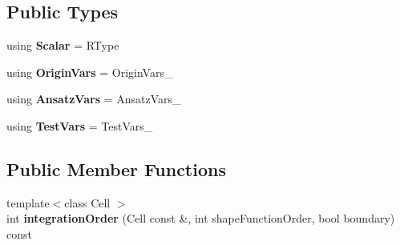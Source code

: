 \subsection*{Public Types}
\begin{DoxyCompactItemize}
\item 
\hypertarget{classSpacy_1_1KaskadeParabolic_1_1PDE_1_1ScalarProdFunctional_a0401febcf68c7c3039c04c3f81446681}{using {\bfseries Scalar} = R\-Type}\label{classSpacy_1_1KaskadeParabolic_1_1PDE_1_1ScalarProdFunctional_a0401febcf68c7c3039c04c3f81446681}

\item 
\hypertarget{classSpacy_1_1KaskadeParabolic_1_1PDE_1_1ScalarProdFunctional_a935bf4d6ee836a8bc6f942118f45908e}{using {\bfseries Origin\-Vars} = Origin\-Vars\-\_\-}\label{classSpacy_1_1KaskadeParabolic_1_1PDE_1_1ScalarProdFunctional_a935bf4d6ee836a8bc6f942118f45908e}

\item 
\hypertarget{classSpacy_1_1KaskadeParabolic_1_1PDE_1_1ScalarProdFunctional_aa3bbc2cc80221b33023c32572f2a8ebd}{using {\bfseries Ansatz\-Vars} = Ansatz\-Vars\-\_\-}\label{classSpacy_1_1KaskadeParabolic_1_1PDE_1_1ScalarProdFunctional_aa3bbc2cc80221b33023c32572f2a8ebd}

\item 
\hypertarget{classSpacy_1_1KaskadeParabolic_1_1PDE_1_1ScalarProdFunctional_a344ca91a5b5d2d13d48ce1dced9f01e6}{using {\bfseries Test\-Vars} = Test\-Vars\-\_\-}\label{classSpacy_1_1KaskadeParabolic_1_1PDE_1_1ScalarProdFunctional_a344ca91a5b5d2d13d48ce1dced9f01e6}

\end{DoxyCompactItemize}
\subsection*{Public Member Functions}
\begin{DoxyCompactItemize}
\item 
\hypertarget{classSpacy_1_1KaskadeParabolic_1_1PDE_1_1ScalarProdFunctional_a6757d413b953ed3c71d0ca1522604d79}{{\footnotesize template$<$class Cell $>$ }\\int {\bfseries integration\-Order} (Cell const \&, int shape\-Function\-Order, bool boundary) const }\label{classSpacy_1_1KaskadeParabolic_1_1PDE_1_1ScalarProdFunctional_a6757d413b953ed3c71d0ca1522604d79}

\end{DoxyCompactItemize}
